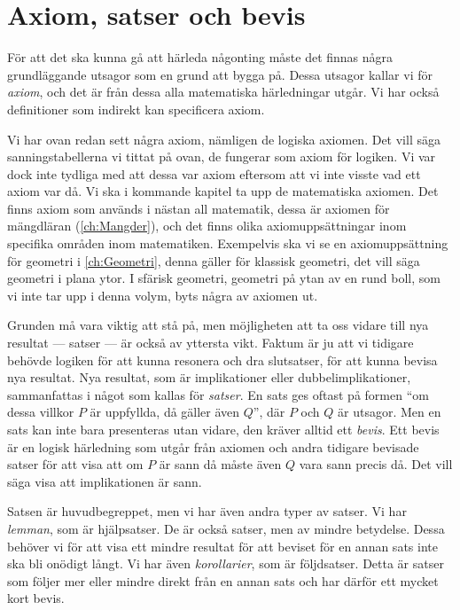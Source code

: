 \section{Axiom, satser och bevis}

För att det ska kunna gå att härleda någonting måste det finnas
några grundläggande utsagor som en grund att bygga på.
Dessa utsagor kallar vi för \emph{axiom}, och det är från dessa
alla matematiska härledningar utgår.
Vi har också definitioner som indirekt kan specificera axiom.

Vi har ovan redan sett några axiom, nämligen de logiska axiomen.
Det vill säga sanningstabellerna vi tittat på ovan, de fungerar som axiom för 
logiken.
Vi var dock inte tydliga med att dessa var axiom eftersom att vi inte visste 
vad ett axiom var då.
Vi ska i kommande kapitel ta upp de matematiska axiomen.
Det finns axiom som används i nästan all matematik, dessa är axiomen för
mängdläran (\cref{ch:Mangder}), och det finns olika axiomuppsättningar 
inom specifika områden inom matematiken.
Exempelvis ska vi se en axiomuppsättning för geometri 
i \cref{ch:Geometri}, denna gäller för klassisk geometri, det vill säga 
geometri i plana ytor.
I sfärisk geometri, geometri på ytan av en rund boll, som vi inte tar upp 
i denna volym, byts några av axiomen ut.

Grunden må vara viktig att stå på, men möjligheten att ta oss vidare till nya 
resultat --- satser --- är också av yttersta vikt.
Faktum är ju att vi tidigare behövde logiken för att kunna resonera och dra
slutsatser, för att kunna bevisa nya resultat.
Nya resultat, som är implikationer eller dubbelimplikationer, sammanfattas i
något som kallas för \emph{satser}.
En sats ges oftast på formen \enquote{om dessa villkor \(P\) är uppfyllda, då 
gäller även \(Q\)}, där \(P\) och \(Q\) är utsagor.
Men en sats kan inte bara presenteras utan vidare, den kräver alltid ett
\emph{bevis}.
Ett bevis är en logisk härledning som utgår från axiomen och andra tidigare
bevisade satser för att visa att om \(P\) är sann då måste även \(Q\) vara sann
precis då.
Det vill säga visa att implikationen är sann.

Satsen är huvudbegreppet, men vi har även andra typer av satser.
Vi har \emph{lemman}, som är hjälpsatser.
De är också satser, men av mindre betydelse.
Dessa behöver vi för att visa ett mindre resultat för att beviset för en annan
sats inte ska bli onödigt långt.
Vi har även \emph{korollarier}, som är
följdsatser.
Detta är satser som följer mer eller mindre direkt från en annan sats och har
därför ett mycket kort bevis.

